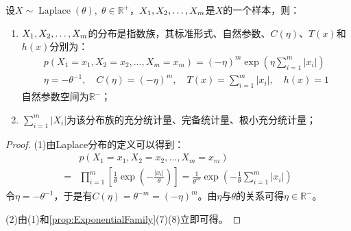 \begin{theorem}
	设$X\sim\operatorname{Laplace}(\theta),\;\theta\in\mathbb{R}^{+}$，$X_1, X_2, \dots, X_{m}$是$X$的一个样本，则：
	\begin{enumerate}
		\item $X_1, X_2, \dots, X_{m}$的分布是指数族，其标准形式、自然参数、$C(\eta)$、$T(x)$和$h(x)$分别为：
		\begin{gather*}
			p(X_1=x_1,X_2=x_2,\dots,X_m=x_m) =(-\eta)^m\exp\left(\eta\sum_{i=1}^{m}|x_i|\right) \\
			\eta=-\theta^{-1},\quad C(\eta)=(-\eta)^m,\quad
			T(x)=\sum_{i=1}^{m}|x_i|,\quad h(x)=1
		\end{gather*}
		自然参数空间为$\mathbb{R}^{-}$；
		\item $\sum\limits_{i=1}^{m}|X_i|$为该分布族的充分统计量、完备统计量、极小充分统计量；
	\end{enumerate}
\end{theorem}
\begin{proof}
	(1)由Laplace分布的定义可以得到：
	\begin{align*}
		&p(X_1=x_1,X_2=x_2,\dots,X_m=x_m) \\
		=&\prod_{i=1}^{m}\left[\frac{1}{\theta}\exp\left(-\frac{|x_i|}{\theta}\right)\right]=\frac{1}{\theta^m}\exp\left(-\frac{1}{\theta}\sum_{i=1}^{m}|x_i|\right)
	\end{align*}
	令$\eta=-\theta^{-1}$，于是有$C(\eta)=\theta^{-m}=(-\eta)^m$。由$\eta$与$\theta$的关系可得$\eta\in\mathbb{R}^{-}$。\par
	(2)由(1)和\cref{prop:ExponentialFamily}(7)(8)立即可得。
\end{proof}

